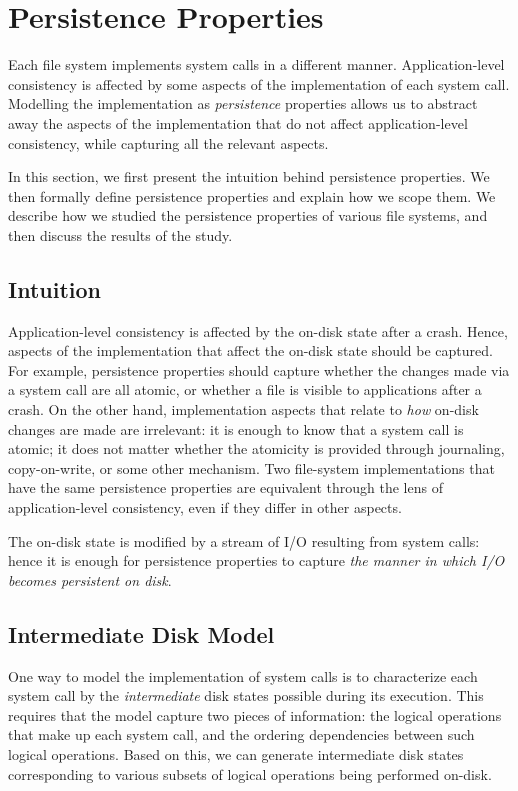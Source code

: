 \section{Persistence Properties}
\label{sec-properties} 
Each file system implements system calls in a different manner.
Application-level consistency is affected by some aspects of the implementation
of each system call. Modelling the implementation as \textit{persistence}
properties allows us to abstract away the aspects of the implementation that do
not affect application-level consistency, while capturing all the relevant
aspects.

In this section, we first present the intuition behind persistence properties.
We then formally define persistence properties and explain how we scope them.
We describe how we studied the persistence properties of various file
systems, and then discuss the results of the study.

\subsection{Intuition}
Application-level consistency is affected by the on-disk state after a crash.
Hence, aspects of the implementation that affect the on-disk state should be
captured. For example, persistence properties should capture whether the
changes made via a system call are all atomic, or whether a file is visible to
applications after a crash. On the other hand, implementation aspects that
relate to \textit{how} on-disk changes are made are irrelevant: it is enough to
know that a system call is atomic; it does not matter whether the atomicity is
provided through journaling,  copy-on-write, or some other mechanism. Two
file-system implementations that have the same persistence properties are
equivalent through the lens of application-level consistency, even if they
differ in other aspects.

The on-disk state is modified by a stream of I/O resulting from system calls:
hence it is enough for persistence properties to capture \textit{the manner in
which I/O becomes persistent on disk}.

\subsection{Intermediate Disk Model}
\label{sec-intermediatemodel}
One way to model the implementation of system calls is to characterize each
system call by the \textit{intermediate} disk states possible during its
execution. This requires that the model capture two pieces of information: the
logical operations that make up each system call, and the ordering dependencies
between such logical operations.     Based on this, we can generate
intermediate disk states corresponding to various subsets of logical operations
being performed on-disk.

